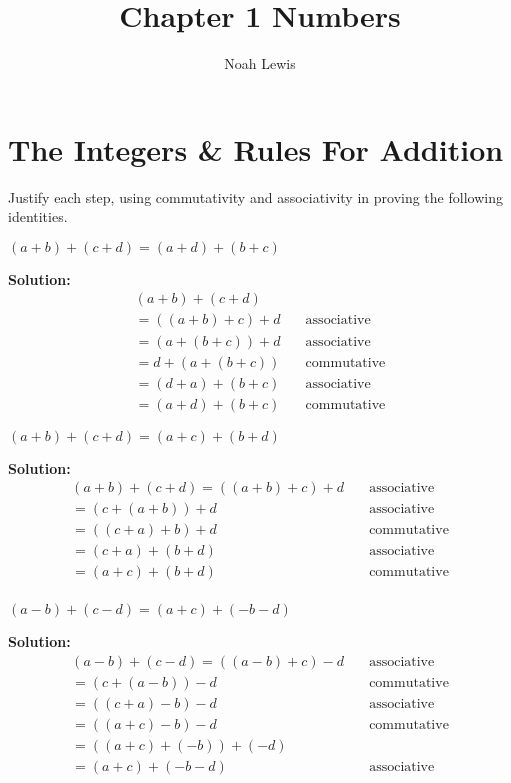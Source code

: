 \documentclass[6pt]{article}
\title{Chapter 1 Numbers}
\author{Noah Lewis}
\begin{document}
\maketitle

\section{The Integers \& Rules For Addition}

Justify each step, using commutativity and associativity in proving the
following identities.

\begin{tcolorbox}[title=Problem 1, breakable]
$(a + b) + (c + d) = (a + d) + (b + c)$
\end{tcolorbox}

\textbf{Solution:}
\begin{align*}
(a + b) + (c + d) & \quad \text{} \\
=((a + b) + c) + d & \quad \text{associative} \\
=(a + (b + c)) + d & \quad \text{associative} \\
=d + (a + (b + c)) & \quad \text{commutative} \\
=(d + a) + (b + c) & \quad \text{associative} \\
=(a + d) + (b + c) & \quad \text{commutative}
\end{align*}


\begin{tcolorbox}[title=Problem 2, breakable]
$(a + b) + (c + d) = (a + c) + (b + d)$
\end{tcolorbox}

\textbf{Solution:}
\begin{align*}
(a + b) + (c + d) = ((a + b) + c) + d & \quad \text{associative} \\
=(c + (a + b)) + d & \quad \text{associative} \\
=((c + a) + b) + d & \quad \text{commutative} \\
=(c + a) + (b + d) & \quad \text{associative} \\
=(a + c) + (b + d) & \quad \text{commutative} \\
\end{align*}

\begin{tcolorbox}[title=Problem 3, breakable]
$(a - b) + (c - d) = (a + c) + (-b - d)$
\end{tcolorbox}

\textbf{Solution:}
\begin{align*}
(a - b) + (c - d) = ((a - b) + c) - d & \quad \text{associative} \\
=(c + (a - b)) - d & \quad \text{commutative} \\
=((c + a) - b) - d & \quad \text{associative} \\
=((a + c) - b) - d & \quad \text{commutative} \\
=((a + c) + (-b)) + (-d) & \quad \text{} \\
=(a + c) + (-b - d) & \quad \text{associative} \\
\end{align*}
\end{document}

